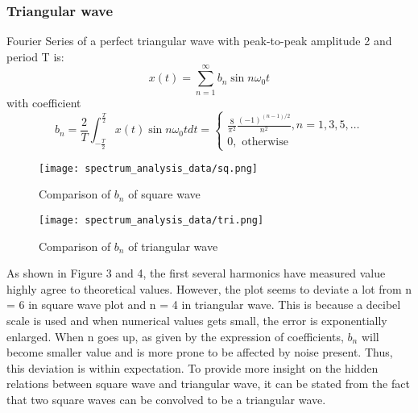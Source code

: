 \documentclass[12pt]{article}[times]
\begin{document}
\subsubsection{Triangular wave}
Fourier Series of a perfect triangular wave with peak-to-peak
amplitude 2 and period T is:
\begin{equation}
  x(t) = \sum^{\infty}_{n=1} b_n \sin{n\omega_0 t}
\end{equation}
with coefficient 
\begin{equation}
  b_n = \frac{2}{T}\int^{\frac{T}{2}}_{-\frac{T}{2}}x(t)\sin{n\omega_0 t}dt =
  \begin{cases}
    \frac{8}{\pi^2}\frac{(-1)^{(n-1)/2}}{n^2}, n = 1, 3, 5, \dots \\
    0, \text{ otherwise}
  \end{cases}
\end{equation}
\noindent %
\begin{figure}[h]
  \centering
  \begin{minipage}{0.45\textwidth}
    \texttt{[image: spectrum\_analysis\_data/sq.png]}
    \caption{Comparison of $b_n$ of square wave}
  \end{minipage}
  \hfill %
  \begin{minipage}{0.45\textwidth}
    \texttt{[image: spectrum\_analysis\_data/tri.png]}
    \caption{Comparison of $b_n$ of triangular wave}
  \end{minipage}
\end{figure}
\newpage
As shown in Figure 3 and 4, the first several harmonics have measured value
highly agree to theoretical values. However, the plot seems to 
deviate a lot from n = 6 in square wave plot and n = 4 in triangular
wave. This is because a decibel scale is used and when numerical
values gets small, the error is exponentially enlarged. When n goes up,
as given by the expression of coefficients, $b_n$ will become smaller value
and is more prone to be affected by noise present. Thus, this deviation
is within expectation.
\newline
To provide more insight on the hidden relations between square
wave and triangular wave, it can be stated from the fact that 
two square waves can be convolved to be a triangular wave.
\end{document}
